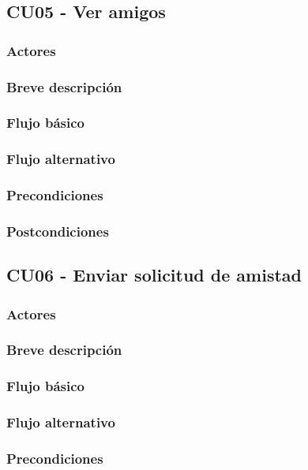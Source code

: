 \documentclass[12pt, a4paper, titlepage]{article}
\begin{document}
\subsection{CU05 - Ver amigos}
\subsubsection{Actores}
\subsubsection{Breve descripción}
\subsubsection{Flujo básico}
\subsubsection{Flujo alternativo}
\subsubsection{Precondiciones}
\subsubsection{Postcondiciones}

\newpage

\subsection{CU06 - Enviar solicitud de amistad}
\subsubsection{Actores}
\subsubsection{Breve descripción}
\subsubsection{Flujo básico}
\subsubsection{Flujo alternativo}
\subsubsection{Precondiciones}
\end{document}

